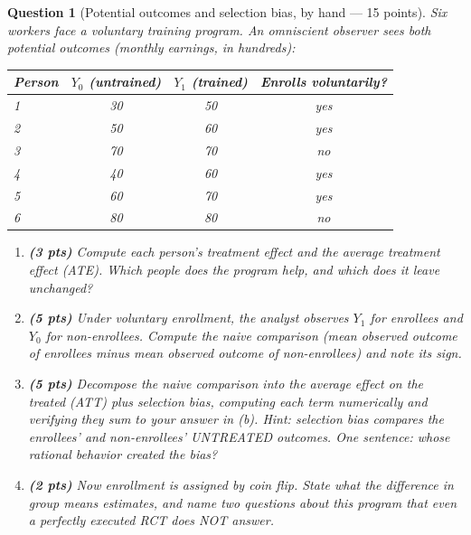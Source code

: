 \documentclass[11pt]{article}
\newtheorem{question}{Question}
\begin{document}
\begin{question}[Potential outcomes and selection bias, by hand --- 15
points]
Six workers face a voluntary training program. An omniscient observer
sees both potential outcomes (monthly earnings, in hundreds):

\begin{center}
\begin{tabular}{@{}lccc@{}}
\toprule
Person & $Y_0$ (untrained) & $Y_1$ (trained) & Enrolls voluntarily? \\
\midrule
1 & 30 & 50 & yes \\
2 & 50 & 60 & yes \\
3 & 70 & 70 & no  \\
4 & 40 & 60 & yes \\
5 & 60 & 70 & yes \\
6 & 80 & 80 & no  \\
\bottomrule
\end{tabular}
\end{center}

\begin{enumerate}[label=(\alph*)]
  \item \textbf{(3 pts)} Compute each person's treatment effect and the
        average treatment effect (ATE). Which people does the program
        help, and which does it leave unchanged?
  \item \textbf{(5 pts)} Under voluntary enrollment, the analyst
        observes $Y_1$ for enrollees and $Y_0$ for non-enrollees.
        Compute the naive comparison (mean observed outcome of enrollees
        minus mean observed outcome of non-enrollees) and note its sign.
  \item \textbf{(5 pts)} Decompose the naive comparison into the average
        effect on the treated (ATT) plus selection bias, computing each
        term numerically and verifying they sum to your answer in (b).
        \emph{Hint: selection bias compares the enrollees' and
        non-enrollees' UNTREATED outcomes.} One sentence: whose rational
        behavior created the bias?
  \item \textbf{(2 pts)} Now enrollment is assigned by coin flip. State
        what the difference in group means estimates, and name two
        questions about this program that even a perfectly executed RCT
        does NOT answer.
\end{enumerate}
\end{question}
\end{document}
